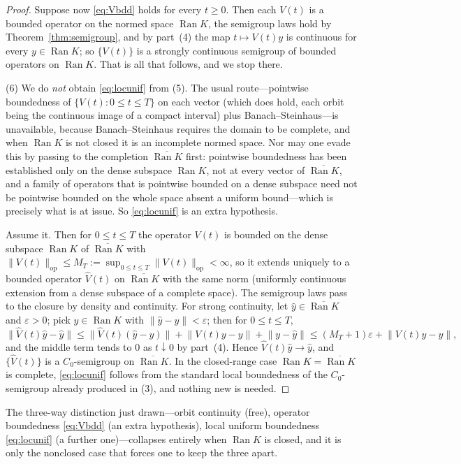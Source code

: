 \documentclass[11pt,reqno]{amsart}
\numberwithin{equation}{section}
\theoremstyle{plain}
\theoremstyle{definition}
\theoremstyle{remark}
\newcommand{\Ran}{\operatorname{Ran}}
\begin{document}
\begin{proof}
Suppose now \eqref{eq:Vbdd} holds for every $t\ge0$. Then each $V(t)$ is a bounded operator
on the normed space $\Ran K$, the semigroup laws hold by Theorem~\ref{thm:semigroup}, and by
part~(4) the map $t\mapsto V(t)y$ is continuous for every $y\in\Ran K$; so $\{V(t)\}$ is a
strongly continuous semigroup of bounded operators on $\Ran K$. That is all that follows, and
we stop there.

(6) We do \emph{not} obtain \eqref{eq:locunif} from (5). The usual route---pointwise
boundedness of $\{V(t):0\le t\le T\}$ on each vector (which does hold, each orbit being the
continuous image of a compact interval) plus Banach--Steinhaus---is unavailable, because
Banach--Steinhaus requires the domain to be complete, and when $\Ran K$ is not closed it is an
incomplete normed space. Nor may one evade this by passing to the completion
$\overline{\Ran K}$ first: pointwise boundedness has been established only on the dense
subspace $\Ran K$, not at every vector of $\overline{\Ran K}$, and a family of operators that
is pointwise bounded on a dense subspace need not be pointwise bounded on the whole space
absent a uniform bound---which is precisely what is at issue. So \eqref{eq:locunif} is an
extra hypothesis.

Assume it. Then for $0\le t\le T$ the operator $V(t)$ is bounded on the dense subspace
$\Ran K$ of $\overline{\Ran K}$ with $\lVert V(t)\rVert_{\mathrm{op}}\le M_{T}
:=\sup_{0\le t\le T}\lVert V(t)\rVert_{\mathrm{op}}<\infty$, so it extends uniquely to a bounded
operator $\widehat V(t)$ on $\overline{\Ran K}$ with the same norm (uniformly continuous
extension from a dense subspace of a complete space). The semigroup laws pass to the closure by
density and continuity. For strong continuity, let $\hat y\in\overline{\Ran K}$ and
$\varepsilon>0$; pick $y\in\Ran K$ with $\lVert\hat y-y\rVert<\varepsilon$; then for
$0\le t\le T$,
\[
\lVert\widehat V(t)\hat y-\hat y\rVert
\le\lVert\widehat V(t)(\hat y-y)\rVert+\lVert V(t)y-y\rVert+\lVert y-\hat y\rVert
\le(M_{T}+1)\varepsilon+\lVert V(t)y-y\rVert ,
\]
and the middle term tends to $0$ as $t\downarrow0$ by part~(4). Hence
$\widehat V(t)\hat y\to\hat y$, and $\{\widehat V(t)\}$ is a $C_{0}$-semigroup on
$\overline{\Ran K}$. In the closed-range case $\Ran K=\overline{\Ran K}$ is complete,
\eqref{eq:locunif} follows from the standard local boundedness of the $C_{0}$-semigroup already
produced in (3), and nothing new is needed.
\end{proof}

The three-way distinction just drawn---orbit continuity (free), operator boundedness
\eqref{eq:Vbdd} (an extra hypothesis), local uniform boundedness \eqref{eq:locunif} (a further
one)---collapses entirely when $\Ran K$ is closed, and it is only the nonclosed case that
forces one to keep the three apart.
\end{document}
